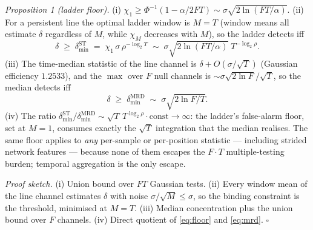 \documentclass[journal]{IEEEtran}
\begin{document}
\emph{Proposition 1 (ladder floor).}  (i) $\chi_1 \ge
\Phi^{-1}(1-\alpha/2FT) \sim \sigma\sqrt{2\ln(FT/\alpha)}$.  (ii) For a
persistent line the optimal ladder window is $M{=}T$ (window means all
estimate $\delta$ regardless of $M$, while $\chi_M$ decreases with $M$), so
the ladder detects iff
\begin{equation}
\delta \;\ge\; \delta^{\mathrm{ST}}_{\min}
 \;=\; \chi_1\,\sigma\,\rho^{-\log_2 T}
 \;\sim\; \sigma\sqrt{2\ln(FT/\alpha)}\;T^{-\log_2\rho}.
\label{eq:floor}
\end{equation}
(iii) The time-median statistic of the line channel is
$\delta + O(\sigma/\sqrt{T})$ (Gaussian efficiency $1.2533$), and the
$\max$ over $F$ null channels is $\sim\sigma\sqrt{2\ln F}/\sqrt{T}$, so the
median detects iff
\begin{equation}
\delta \;\ge\; \delta^{\mathrm{MRD}}_{\min}
 \;\sim\; \sigma\sqrt{2\ln F / T}.
\label{eq:mrd}
\end{equation}
(iv) The ratio $\delta^{\mathrm{ST}}_{\min}/\delta^{\mathrm{MRD}}_{\min}
\sim \sqrt{T}\,T^{\log_2\rho}\cdot\mathrm{const} \to \infty$: the ladder's
false-alarm floor, set at $M{=}1$, consumes exactly the $\sqrt{T}$
integration that the median realises.  The same floor applies to
\emph{any} per-sample or per-position statistic --- including strided
network features --- because none of them escapes the $F\cdot T$
multiple-testing burden; temporal aggregation is the only escape.

\emph{Proof sketch.}  (i) Union bound over $FT$ Gaussian tests.  (ii) Every
window mean of the line channel estimates $\delta$ with noise
$\sigma/\sqrt{M} \le \sigma$, so the binding constraint is the threshold,
minimised at $M{=}T$.  (iii) Median concentration plus the union bound over
$F$ channels.  (iv) Direct quotient of
\eqref{eq:floor} and \eqref{eq:mrd}.  \hfill$\square$
\end{document}

